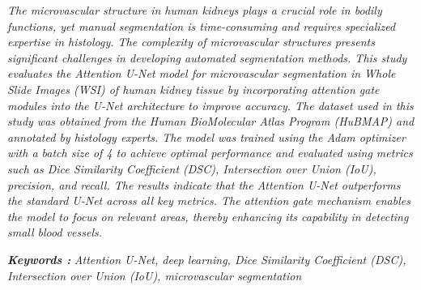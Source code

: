 \begin{abstracteng}
\justifying
\emph{
The microvascular structure in human kidneys plays a crucial role in bodily functions, yet manual segmentation is time-consuming and requires specialized expertise in histology. The complexity of microvascular structures presents significant challenges in developing automated segmentation methods. This study evaluates the Attention U-Net model for microvascular segmentation in Whole Slide Images (WSI) of human kidney tissue by incorporating attention gate modules into the U-Net architecture to improve accuracy. The dataset used in this study was obtained from the Human BioMolecular Atlas Program (HuBMAP) and annotated by histology experts. The model was trained using the Adam optimizer with a batch size of 4 to achieve optimal performance and evaluated using metrics such as Dice Similarity Coefficient (DSC), Intersection over Union (IoU), precision, and recall. The results indicate that the Attention U-Net outperforms the standard U-Net across all key metrics. The attention gate mechanism enables the model to focus on relevant areas, thereby enhancing its capability in detecting small blood vessels.}

\bigskip
\noindent
\textbf{\emph{Keywords :}} \emph{Attention U-Net, deep learning, Dice Similarity Coefficient (DSC), Intersection over Union (IoU), microvascular segmentation}
\end{abstracteng}
